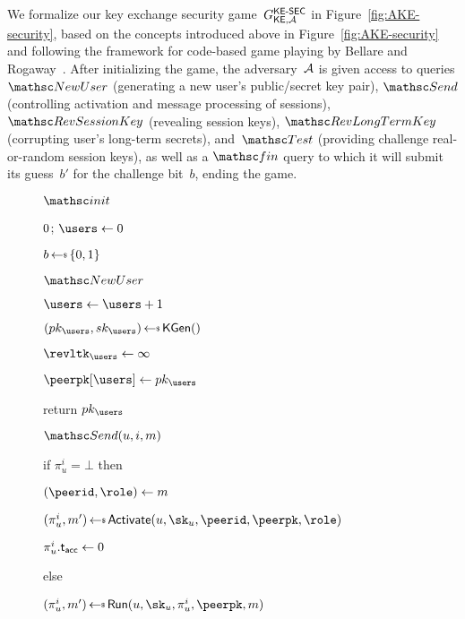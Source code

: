 We formalize our key exchange security game~$G^{\mathsf{KE{\text{\normalfont-}}SEC}}_{\mathsf{KE},\mathcal{A}}$ in Figure~\ref{fig:AKE-security},
based on the concepts introduced above in Figure~\ref{fig:AKE-security}
and following the framework for code-based game playing by Bellare and Rogaway~\cite{EC:BelRog06}.
After initializing the game, %
the adversary~$\mathcal{A}$ is given access to queries
$\NewUser$ (generating a new user's public/secret key pair),
$\Send$ (controlling activation and message processing of sessions),
$\RevSessionKey$ (revealing session keys),
$\RevLongTermKey$ (corrupting user's long-term secrets),
and~$\Test$ (providing challenge real-or-random session keys),
as well as a $\Finalize$ query to which it will submit its guess~$b'$ for the challenge bit~$b$, ending the game.
\begin{figure}[tp]
	\begin{minipage}[t]{0.5\textwidth}
		
		\begin{oracle}{$\Initialize$}
			\item $\time \gets 0$; $\users \gets 0$
			\item $b \getsr \bits$
		\end{oracle}
		
		\ExptSepSpace
		
		\begin{oracle}{$\NewUser$}
			\item $\users \gets \users + 1$
			\item $(pk_\users, sk_\users) \getsr \KEKGen()$
			\item $\revltk_\users \gets \infty$
			\item $\peerpk[\users] \gets \pk_{\users}$
			\item return $pk_\users$
		\end{oracle}
		
		\ExptSepSpace
		
		\begin{oracle}{$\Send(u, i, m)$}
			\item if $\pi_u^i = \bot$ then
			\item \hindent $(\peerid,\role) \gets m$
			\item \hindent $(\pi_u^i, m') \getsr \KEActivate(u\cab \sk_u\cab \peerid\cab \peerpk\cab \role)$
			\item \hindent $\pi_u^i.\mathsf{t_{acc}} \gets 0$
			
			\item else
			\item \hindent $(\pi_u^i, m') \getsr \KERun(u, \sk_u, \pi_u^i, \peerpk, m)$
			

\end{oracle}
\end{minipage}
\end{figure}
